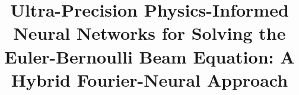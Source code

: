 \documentclass[preprint,12pt]{elsarticle}
\begin{document}
\begin{frontmatter}

\title{Ultra-Precision Physics-Informed Neural Networks for Solving the Euler-Bernoulli Beam Equation: A Hybrid Fourier-Neural Approach}



\end{frontmatter}
\end{document}
